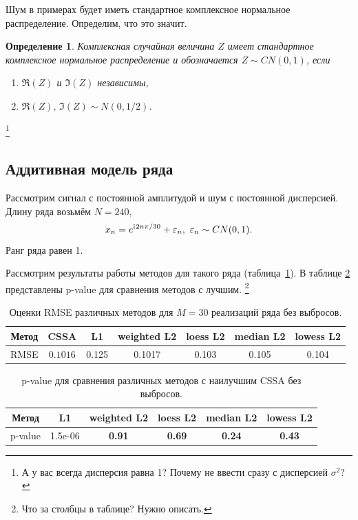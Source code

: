 \documentclass[specialist,
               substylefile = spbu.rtx,
               subf,href,colorlinks=true, 12pt]{disser}
\newtheorem*{def*}{Определение}
\begin{document}
Шум в примерах будет иметь стандартное комплексное нормальное распределение. Определим, что это значит.
\begin{def*}
	Комплексная случайная величина $Z$ имеет стандартное комплексное нормальное распределение и обозначается $Z \sim CN(0, 1)$, если
	\begin{enumerate}
		\item $\Re(Z)$ и $\Im(Z)$ независимы,
		\item $\Re(Z), \, \Im(Z) \sim N(0, 1/2)$.
	\end{enumerate}
\end{def*}
\footnote{А у вас всегда дисперсия равна 1? Почему не ввести сразу с дисперсией $\sigma^2$?}

\subsection{Аддитивная модель ряда}

Рассмотрим сигнал с постоянной амплитудой и шум с постоянной дисперсией.
Длину ряда возьмём $N = 240$,
$$x_n = e^{\mathrm{i}\mkern1mu 2n\pi/30} + \varepsilon_n, ~ \varepsilon_n \sim CN(0,1).$$
Ранг ряда равен 1.

Рассмотрим результаты работы методов для такого ряда (таблица~\ref{tab1}). В таблице \ref{tab: pval1} представлены p-value для сравнения методов с лучшим. 
\footnote{Что за столбцы в таблице? Нужно описать.}

\begin{table}[H]
	\begin{center}
		\caption{Оценки RMSE различных методов для $M = 30$ реализаций ряда без выбросов.}
		\label{tab1}
		\begin{tabular}{|c|c|c|c|c|c|c|}
			\hline
			Метод	& CSSA & L1 & weighted L2 & loess L2 & median L2 & lowess L2 \\
			\hline
			RMSE & $\mathbf{0.1016}$  & 0.125  & 0.1017 & 0.103 & 0.105 & 0.104\\
			\hline
		\end{tabular}
	\end{center}
\end{table}

\begin{table}[H]
	\caption{p-value для сравнения различных методов с наилучшим CSSA без выбросов.}
	\label{tab: pval1}
	\begin{center}
		\begin{tabular}{|c|c|c|c|c|c|}
			\hline
			Метод & L1 & weighted L2 & loess L2 & median L2 & lowess L2  \\
			\hline
			p-value & 1.5e-06   & \textbf{0.91} & \textbf{0.69}  & \textbf{0.24} & \textbf{0.43}  \\
			\hline
		\end{tabular}
	\end{center}
\end{table}
\end{document}
